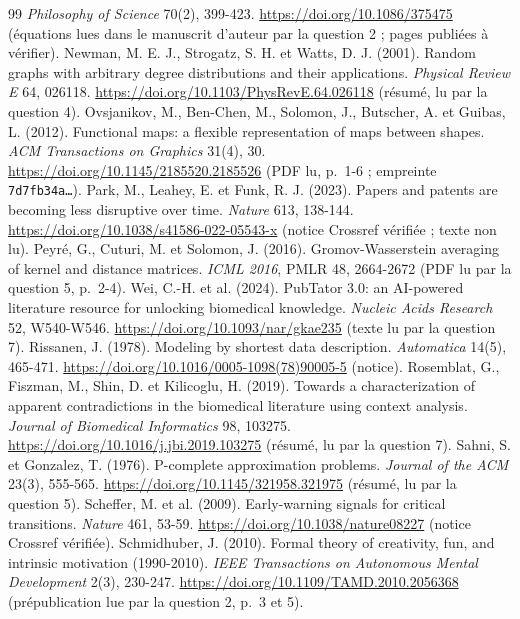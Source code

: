 \documentclass[11pt,a4paper]{article}
\theoremstyle{definition}
\theoremstyle{plain}
\begin{document}
\begin{thebibliography}{99}
\emph{Philosophy of Science} 70(2), 399-423. \url{https://doi.org/10.1086/375475} (équations lues dans
le manuscrit d'auteur par la question 2 ; pages publiées à vérifier).
 Newman, M. E. J., Strogatz, S. H. et Watts, D. J. (2001). Random graphs with
arbitrary degree distributions and their applications. \emph{Physical Review E} 64, 026118.
\url{https://doi.org/10.1103/PhysRevE.64.026118} (résumé, lu par la question 4).
 Ovsjanikov, M., Ben-Chen, M., Solomon, J., Butscher, A. et Guibas, L. (2012).
Functional maps: a flexible representation of maps between shapes. \emph{ACM Transactions on
Graphics} 31(4), 30. \url{https://doi.org/10.1145/2185520.2185526} (PDF lu, p.~1-6 ; empreinte
\texttt{7d7fb34a…}).
 Park, M., Leahey, E. et Funk, R. J. (2023). Papers and patents are becoming less
disruptive over time. \emph{Nature} 613, 138-144. \url{https://doi.org/10.1038/s41586-022-05543-x}
(notice Crossref vérifiée ; texte non lu).
 Peyré, G., Cuturi, M. et Solomon, J. (2016). Gromov-Wasserstein averaging of kernel
and distance matrices. \emph{ICML 2016}, PMLR 48, 2664-2672 (PDF lu par la question 5, p.~2-4).
 Wei, C.-H. et al. (2024). PubTator 3.0: an AI-powered literature resource for
unlocking biomedical knowledge. \emph{Nucleic Acids Research} 52, W540-W546.
\url{https://doi.org/10.1093/nar/gkae235} (texte lu par la question 7).
 Rissanen, J. (1978). Modeling by shortest data description. \emph{Automatica}
14(5), 465-471. \url{https://doi.org/10.1016/0005-1098(78)90005-5} (notice).
 Rosemblat, G., Fiszman, M., Shin, D. et Kilicoglu, H. (2019). Towards a
characterization of apparent contradictions in the biomedical literature using context analysis.
\emph{Journal of Biomedical Informatics} 98, 103275. \url{https://doi.org/10.1016/j.jbi.2019.103275}
(résumé, lu par la question 7).
 Sahni, S. et Gonzalez, T. (1976). P-complete approximation problems. \emph{Journal of
the ACM} 23(3), 555-565. \url{https://doi.org/10.1145/321958.321975} (résumé, lu par la question 5).
 Scheffer, M. et al. (2009). Early-warning signals for critical transitions.
\emph{Nature} 461, 53-59. \url{https://doi.org/10.1038/nature08227} (notice Crossref vérifiée).
 Schmidhuber, J. (2010). Formal theory of creativity, fun, and intrinsic
motivation (1990-2010). \emph{IEEE Transactions on Autonomous Mental Development} 2(3), 230-247.
\url{https://doi.org/10.1109/TAMD.2010.2056368} (prépublication lue par la question 2, p.~3 et 5).

\end{thebibliography}
\end{document}
